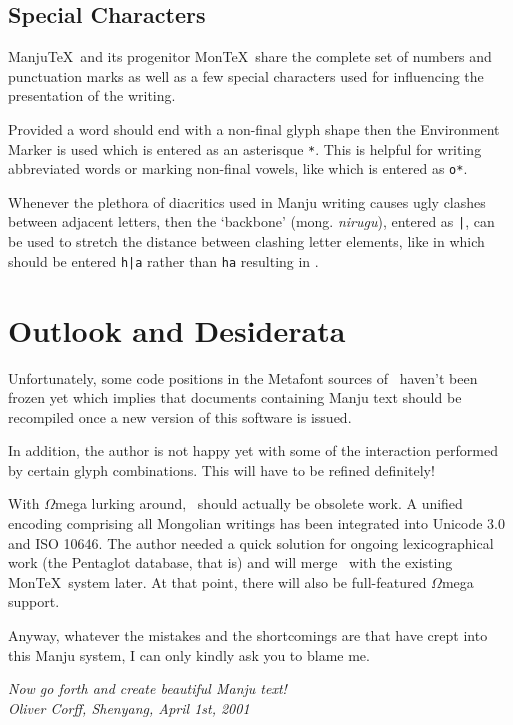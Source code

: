 \documentclass[a4paper,11pt]{article}
\begin{document}
\subsection{Special Characters}

Manju\TeX\ and its progenitor Mon\TeX\ share the complete
set of numbers and punctuation marks as well as a few special
characters used for influencing the presentation of the writing.

Provided a word should end with a non-final glyph shape then the Environment
Marker \mabosoo{**} is used which is entered as an asterisque
\verb-*-. This is helpful for writing abbreviated words or marking
non-final vowels, like  which is entered as \verb-o*-.

Whenever the plethora of diacritics used in Manju writing causes
ugly clashes between adjacent letters, then the `backbone' (mong.
\textit{nirugu}), entered as \verb'|', can be used to stretch the
distance between clashing letter elements, like in 
which should be entered \verb-h|a- rather than \verb-ha- resulting
in .

\section{Outlook and Desiderata}

Unfortunately, some code positions in the Metafont sources of
\ManjuTeX\ haven't
been frozen yet which implies that documents containing Manju text
should be recompiled once a new version of this software is issued.

In addition, the author is not happy yet with some of the
interaction performed by certain glyph combinations. This will have
to be refined definitely!

With $\Omega$mega lurking around, \ManjuTeX\ should actually be obsolete
work. A unified encoding comprising all Mongolian writings has been
integrated into Unicode 3.0 and ISO 10646. The author needed a quick
solution for ongoing lexicographical work (the Pentaglot database,
that is) and will merge \ManjuTeX\ with the existing Mon\TeX\ system
later. At that point, there will also be full-featured $\Omega$mega
support.

Anyway, whatever the mistakes and the shortcomings are that have 
crept into this Manju system, I can only kindly ask you to blame me.

\vspace{1cm}
\hfill\parbox{4cm}{\it Now go forth and create beautiful Manju text!\\
			Oliver Corff, Shenyang, April 1st, 2001}
\end{document}
